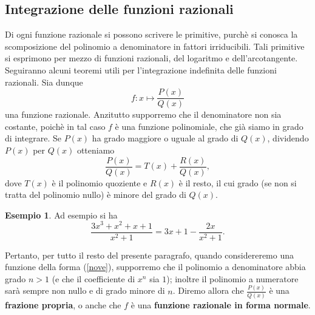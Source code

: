 \documentclass{article}
\theoremstyle{plain}
\theoremstyle{definition}
\newtheorem{exmp}{Esempio}[section]
\theoremstyle{remark}
\begin{document}
\vspace{10pt}

\subsection{Integrazione delle funzioni razionali}

\vspace{10pt}

Di ogni funzione razionale si possono scrivere le primitive, purchè si conosca la scomposizione del polinomio a denominatore in fattori irriducibili. Tali primitive si esprimono per mezzo di funzioni razionali, del logaritmo e dell'arcotangente. Seguiranno alcuni teoremi utili per l'integrazione indefinita delle funzioni razionali.
Sia dunque 
\begin{equation}
    f:x\mapsto \dfrac{P(x)}{Q(x)}\label{nove}
\end{equation}
una funzione razionale. Anzitutto supporremo che il denominatore non sia costante, poichè in tal caso $f$ è una funzione polinomiale, che già siamo in grado di integrare. 
Se $P(x)$ ha grado maggiore o uguale al grado di $Q(x)$, dividendo $P(x)$ per $Q(x)$ otteniamo 
\[\dfrac{P(x)}{Q(x)}=T(x)+\dfrac{R(x)}{Q(x)},\]
dove $T(x)$ è il polinomio quoziente e $R(x)$ è il resto, il cui grado (se non si tratta del polinomio nullo) è minore del grado di $Q(x)$.

\vspace{10pt}

\begin{exmp}
    Ad esempio si ha 
    \[\dfrac{3x^3+x^2+x+1}{x^2+1}=3x+1-\dfrac{2x}{x^2+1}.\]
\end{exmp}

\vspace{10pt}

Pertanto, per tutto il resto del presente paragrafo, quando considereremo una funzione della forma (\ref{nove}), supporremo che il polinomio a denominatore abbia grado $n>1$ (e che il coefficiente di $x^n$ sia $1$);
inoltre il polinomio a numeratore sarà sempre non nullo e di grado minore di $n$. Diremo allora che $\frac{P(x)}{Q(x)}$ è una \textbf{frazione propria}, o anche che $f$ è una \textbf{funzione razionale in forma normale}.

\vspace{10pt}
\end{document}
